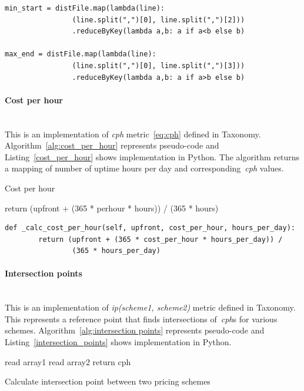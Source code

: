 \documentclass[]{final_report}
\newcommand{\myparagraph}[1]{\paragraph{#1}\mbox{}\\}
\begin{document}
\begin{minipage}{\linewidth}
\begin{lstlisting}[label={uptime_per_machine_implementation},caption={Uptime per machine implementation in Apache Spark},frame=single] 
min_start = distFile.map(lambda(line): 
                (line.split(",")[0], line.split(",")[2]))
                .reduceByKey(lambda a,b: a if a<b else b)

max_end = distFile.map(lambda(line): 
                (line.split(",")[0], line.split(",")[3]))
                .reduceByKey(lambda a,b: a if a>b else b)
\end{lstlisting}
\end{minipage}

\myparagraph{Cost per hour}

This is an implementation of \textit{cph} metric~\ref{eq:cph} defined in Taxonomy. Algorithm~\ref{alg:cost_per_hour} represents pseudo-code and Listing~\ref{cost_per_hour} shows implementation in Python. The algorithm returns a mapping of number of uptime hours per day and corresponding~\textit{cph} values.

\begin{algorithm}[H]
 \caption{Cost per hour}
 \label{alg:cost_per_hour}
 return (upfront + (365 * perhour * hours)) / (365 * hours)
\end{algorithm}

\begin{minipage}{\linewidth}
\begin{lstlisting}[label={cost_per_hour},caption={Cost per hour implementation in Python},frame=single] 
def _calc_cost_per_hour(self, upfront, cost_per_hour, hours_per_day):
        return (upfront + (365 * cost_per_hour * hours_per_day)) /
                (365 * hours_per_day)
\end{lstlisting}
\end{minipage}

\myparagraph{Intersection points}

This is an implementation of \textit{ip(scheme1, scheme2)} metric defined in Taxonomy. This represents a reference point that finds intersections of~\textit{cph}s for various schemes. Algorithm~\ref{alg:intersection points} represents pseudo-code and Listing~\ref{intersection_points} shows implementation in Python. 

\begin{algorithm}[H]
 \label{alg:intersection points}
 read array1\;
 read array2\;
  {
 	 {
 		return cph
 	}
 }
\caption{Calculate intersection point between two pricing schemes}
\end{algorithm}
\end{document}
